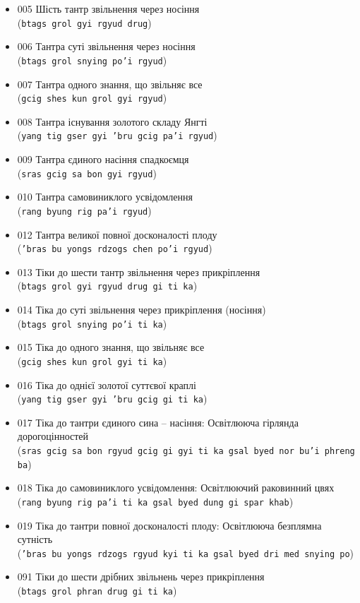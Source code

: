 \documentclass{article}
\begin{document}
\begingroup\raggedright
\begin{itemize}
\item 005 Шість тантр звільнення через носіння \\ (\texttt{btags grol gyi rgyud drug})
\item 006 Тантра суті звільнення через носіння \\ (\texttt{btags grol snying po'i rgyud})
\item 007 Тантра одного знання, що звільняє все \\ (\texttt{gcig shes kun grol gyi rgyud})
\item 008 Тантра існування золотого складу Янгті \\ (\texttt{yang tig gser gyi 'bru gcig pa'i rgyud})
\item 009 Тантра єдиного насіння спадкоємця \\ (\texttt{sras gcig sa bon gyi rgyud})
\item 010 Тантра самовиниклого усвідомлення \\ (\texttt{rang byung rig pa'i rgyud})
\item 012 Тантра великої повної досконалості плоду \\ (\texttt{'bras bu yongs rdzogs chen po'i rgyud})
\item 013 Тіки до шести тантр звільнення через прикріплення \\ (\texttt{btags grol gyi rgyud drug gi ti ka})
\item 014 Тіка до суті звільнення через прикріплення (носіння) \\ (\texttt{btags grol snying po'i ti ka})
\item 015 Тіка до одного знання, що звільняє все \\ (\texttt{gcig shes kun grol gyi ti ka})
\item 016 Тіка до однієї золотої суттєвої краплі \\ (\texttt{yang tig gser gyi 'bru gcig gi ti ka})
\item 017 Тіка до тантри єдиного сина – насіння: Освітлююча гірлянда дорогоцінностей \\ (\texttt{sras gcig sa bon rgyud gcig gi gyi ti ka gsal byed nor bu'i phreng ba})
\item 018 Тіка до самовиниклого усвідомлення: Освітлюючий раковинний цвях \\ (\texttt{rang byung rig pa'i ti ka gsal byed dung gi spar khab})
\item 019 Тіка до тантри повної досконалості плоду: Освітлююча безплямна сутність \\ (\texttt{'bras bu yongs rdzogs rgyud kyi ti ka gsal byed dri med snying po})
\item 091 Тіки до шести дрібних звільнень через прикріплення \\ (\texttt{btags grol phran drug gi ti ka})

\end{itemize}
\endgroup
\end{document}
